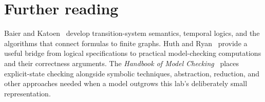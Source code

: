 \section{Further reading}
\label{sec:ch48-reading}

Baier and Katoen~\cite{baier-2008-model-checking} develop transition-system semantics, temporal logics, and the algorithms that connect formulas to finite graphs.
Huth and Ryan~\cite{huth-2004-logic} provide a useful bridge from logical specifications to practical model-checking computations and their correctness arguments.
The \emph{Handbook of Model Checking}~\cite{clarke-2018-handbook} places explicit-state checking alongside symbolic techniques, abstraction, reduction, and other approaches needed when a model outgrows this lab's deliberately small representation.
